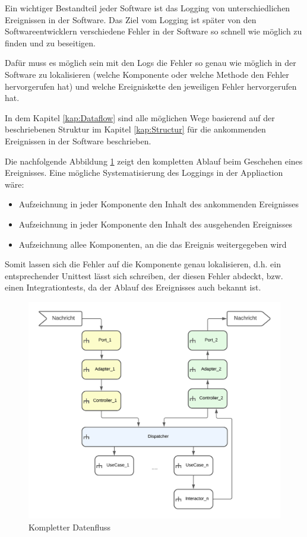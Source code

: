 Ein wichtiger Bestandteil jeder Software ist das Logging von unterschiedlichen Ereignissen in der Software.
Das Ziel vom Logging ist später von den Softwareentwicklern verschiedene Fehler in der Software so schnell wie möglich zu finden und
zu beseitigen.

Dafür muss es möglich sein mit den Logs die Fehler so genau wie möglich in der Software zu lokalisieren 
(welche Komponente oder welche Methode den Fehler hervorgerufen hat) 
und welche Ereigniskette den jeweiligen Fehler hervorgerufen hat.

In dem Kapitel \ref{kap:Dataflow} sind alle möglichen Wege basierend auf der beschriebenen Struktur 
im Kapitel \ref{kap:Structur} für die ankommenden Ereignissen in der Software beschrieben.

Die nachfolgende Abbildung \ref{fig:FullDataFlow} zeigt den kompletten Ablauf beim Geschehen eines Ereignisses.
Eine mögliche Systematisierung des Loggings in der Appliaction wäre: 
\begin{itemize}
    \item Aufzeichnung in jeder Komponente den Inhalt des ankommenden Ereignisses
    \item Aufzeichnung in jeder Komponente den Inhalt des ausgehenden Ereignisses
    \item Aufzeichnung allee Komponenten, an die das Ereignis weitergegeben wird
\end{itemize}

Somit lassen sich die Fehler auf die Komponente genau lokalisieren, d.h. ein entsprechender Unittest lässt sich schreiben, 
der diesen Fehler abdeckt, bzw. einen Integrationtests, da der Ablauf des Ereignisses auch bekannt ist.

\begin{figure}[H]
    \centering
    \includegraphics[width=12cm]{./images/FullDataFlow.png}
     \caption[Kompletter Datenfluss]{Kompletter Datenfluss}
     \label{fig:FullDataFlow}
\end{figure}
